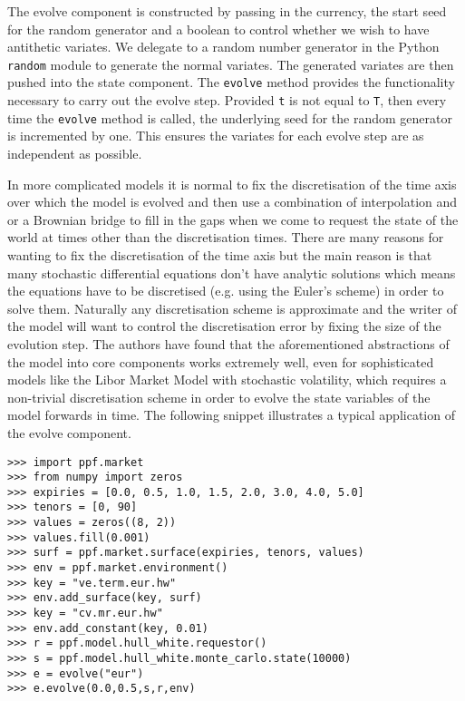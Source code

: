 The evolve component is constructed by passing in the currency, the
start seed for the random generator and a boolean to control whether
we wish to have antithetic variates. We delegate to a random number
generator in the Python \verb|random| module to generate the normal
variates. The generated variates are then pushed into the state
component. The \verb|evolve| method provides the functionality necessary to carry 
out the evolve step. Provided \verb|t| is not equal to \verb|T|, then every time 
the \verb|evolve| method is called, the underlying seed for the random generator 
is incremented by one. This ensures the variates for each evolve step are as 
independent as possible.

In more complicated models it is normal to fix the discretisation of the time
axis over which the model is evolved and then use a combination of
interpolation and or a Brownian bridge to fill in the gaps when we
come to request the state of the world at times other than the
discretisation times. There are many reasons for wanting to fix the 
discretisation of the time axis but the main reason is that many stochastic
differential equations don't have analytic solutions which means the equations
have to be discretised (e.g. using the Euler's scheme) in order to solve them. 
Naturally any discretisation scheme is approximate and the writer of the model 
will want to control the discretisation error by fixing the size of the evolution step. 
The authors have found that the aforementioned abstractions of the model into core
components works extremely well, even for sophisticated models like the
Libor Market Model with stochastic volatility, which requires a 
non-trivial discretisation scheme in order to evolve the state variables of the model 
forwards in time. The following snippet illustrates a typical application of the evolve 
component.

\begin{verbatim}
>>> import ppf.market
>>> from numpy import zeros
>>> expiries = [0.0, 0.5, 1.0, 1.5, 2.0, 3.0, 4.0, 5.0]
>>> tenors = [0, 90]
>>> values = zeros((8, 2))
>>> values.fill(0.001)
>>> surf = ppf.market.surface(expiries, tenors, values)
>>> env = ppf.market.environment()
>>> key = "ve.term.eur.hw"
>>> env.add_surface(key, surf)
>>> key = "cv.mr.eur.hw"
>>> env.add_constant(key, 0.01)
>>> r = ppf.model.hull_white.requestor()
>>> s = ppf.model.hull_white.monte_carlo.state(10000)
>>> e = evolve("eur")
>>> e.evolve(0.0,0.5,s,r,env)
\end{verbatim}

